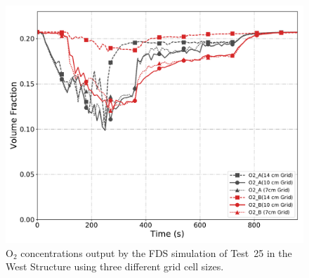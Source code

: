 \begin{figure}[!h]
	\centering
	\includegraphics[width=\columnwidth]{Figures/Plots/Grid_Sensitivity/Gas_Concentration/Test_25_O2}
	\caption[O$_2$ concentrations for West Structure simulation with different grid cell sizes.]{O$_2$ concentrations output by the FDS simulation of Test~25 in the West Structure using three different grid cell sizes.}
	\label{fig:west_O2_sensitivity}
\end{figure}

